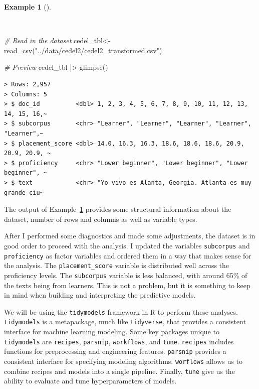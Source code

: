 \documentclass[
  letterpaper,
]{latex/krantz}
\newenvironment{Shaded}{\begin{snugshade}}{\end{snugshade}}
\newcommand{\CommentTok}[1]{\textcolor[rgb]{0.00,0.00,0.00}{\textit{#1}}}
\newcommand{\FunctionTok}[1]{\textcolor[rgb]{0.00,0.00,0.00}{#1}}
\newcommand{\NormalTok}[1]{\textcolor[rgb]{0.00,0.00,0.00}{#1}}
\newcommand{\OtherTok}[1]{\textcolor[rgb]{0.00,0.00,0.00}{#1}}
\newcommand{\SpecialCharTok}[1]{\textcolor[rgb]{0.00,0.00,0.00}{#1}}
\newcommand{\StringTok}[1]{\textcolor[rgb]{0.00,0.00,0.00}{#1}}
\theoremstyle{definition}
\newtheorem{example}{Example}[chapter]
\theoremstyle{remark}
\begin{document}
\begin{example}[]\protect\hypertarget{exm-pda-cedel-read}{}\label{exm-pda-cedel-read}

~

\begin{Shaded}
\begin{Highlighting}[]
\CommentTok{\# Read in the dataset}
\NormalTok{cedel\_tbl}\OtherTok{\textless{}{-}}
  \FunctionTok{read\_csv}\NormalTok{(}\StringTok{"../data/cedel2/cedel2\_transformed.csv"}\NormalTok{)}

\CommentTok{\# Preview}
\NormalTok{cedel\_tbl }\SpecialCharTok{|\textgreater{}} \FunctionTok{glimpse}\NormalTok{()}
\end{Highlighting}
\end{Shaded}

\begin{verbatim}
> Rows: 2,957
> Columns: 5
> $ doc_id          <dbl> 1, 2, 3, 4, 5, 6, 7, 8, 9, 10, 11, 12, 13, 14, 15, 16,~
> $ subcorpus       <chr> "Learner", "Learner", "Learner", "Learner", "Learner",~
> $ placement_score <dbl> 14.0, 16.3, 16.3, 18.6, 18.6, 18.6, 20.9, 20.9, 20.9, ~
> $ proficiency     <chr> "Lower beginner", "Lower beginner", "Lower beginner", ~
> $ text            <chr> "Yo vivo es Alanta, Georgia. Atlanta es muy grande ciu~
\end{verbatim}

\end{example}

The output of Example~\ref{exm-pda-cedel-read} provides some structural
information about the dataset, number of rows and columns as well as
variable types.

After I performed some diagnostics and made some adjustments, the
dataset is in good order to proceed with the analysis. I updated the
variables \texttt{subcorpus} and \texttt{proficiency} as factor
variables and ordered them in a way that makes sense for the analysis.
The \texttt{placement\_score} variable is distributed well across the
proficiency levels. The \texttt{subcorpus} variable is less balanced,
with around 65\% of the texts being from learners. This is not a
problem, but it is something to keep in mind when building and
interpreting the predictive models.

We will be using the \texttt{tidymodels} framework in R to perform these
analyses. \texttt{tidymodels} is a metapackage, much like
\texttt{tidyverse}, that provides a consistent interface for machine
learning modeling. Some key packages unique to \texttt{tidymodels} are
\texttt{recipes}, \texttt{parsnip}, \texttt{workflows}, and
\texttt{tune}. \texttt{recipes} includes functions for preprocessing and
engineering features. \texttt{parsnip} provides a consistent interface
for specifying modeling algorithms. \texttt{worflows} allows us to
combine recipes and models into a single pipeline. Finally,
\texttt{tune} give us the ability to evaluate and tune hyperparameters
of models.
\end{document}

